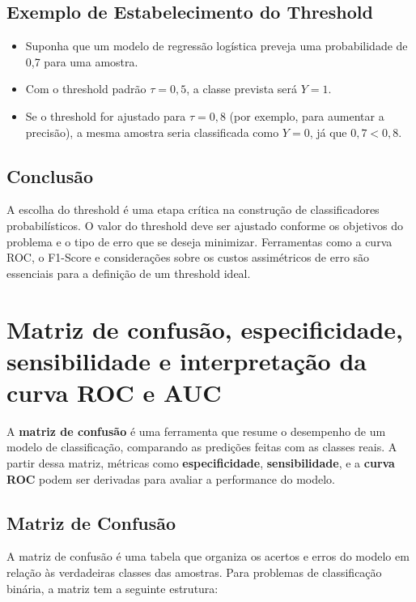 \documentclass{sciposter}
\begin{document}
\begin{multicols}{3}
\subsection{Exemplo de Estabelecimento do Threshold}

\begin{itemize}
    \item Suponha que um modelo de regressão logística preveja uma probabilidade de 0{,}7 para uma amostra.
    \item Com o threshold padrão $\tau = 0{,}5$, a classe prevista será $Y=1$.
    \item Se o threshold for ajustado para $\tau = 0{,}8$ (por exemplo, para aumentar a precisão), a mesma amostra seria classificada como $Y=0$, já que $0{,}7 < 0{,}8$.
\end{itemize}

\subsection{Conclusão}

A escolha do threshold é uma etapa crítica na construção de classificadores probabilísticos. O valor do threshold deve ser ajustado conforme os objetivos do problema e o tipo de erro que se deseja minimizar. Ferramentas como a curva ROC, o F1-Score e considerações sobre os custos assimétricos de erro são essenciais para a definição de um threshold ideal.

\section{Matriz de confusão, especificidade, sensibilidade e interpretação da curva ROC e AUC}

A \textbf{matriz de confusão} é uma ferramenta que resume o desempenho de um modelo de classificação, comparando as predições feitas com as classes reais. A partir dessa matriz, métricas como \textbf{especificidade}, \textbf{sensibilidade}, e a \textbf{curva ROC} podem ser derivadas para avaliar a performance do modelo.

\subsection{Matriz de Confusão}

A matriz de confusão é uma tabela que organiza os acertos e erros do modelo em relação às verdadeiras classes das amostras. Para problemas de classificação binária, a matriz tem a seguinte estrutura:


\end{multicols}
\end{document}
